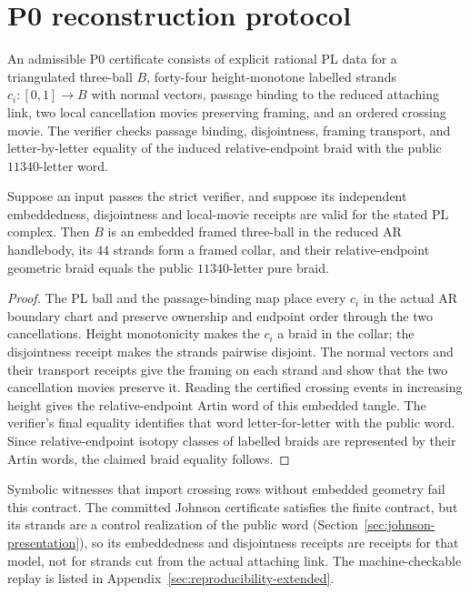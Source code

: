 \section{P0 reconstruction protocol}\label{app:p0-reconstruction}

An admissible P0 certificate consists of explicit rational PL data for a
triangulated three-ball $B$, forty-four height-monotone labelled strands
$c_i:[0,1]\to B$ with normal vectors, passage binding to the reduced
attaching link, two local cancellation movies preserving framing, and an
ordered crossing movie.  The verifier checks passage binding, disjointness,
framing transport, and letter-by-letter equality of the induced
relative-endpoint braid with the public $11340$-letter word.

\begin{lemma}
Suppose an input passes the strict verifier, and suppose its independent
embeddedness, disjointness and local-movie receipts are valid for the stated
PL complex.  Then $B$ is an embedded framed three-ball in the reduced AR
handlebody, its $44$ strands form a framed collar, and their relative-endpoint
geometric braid equals the public $11340$-letter pure braid.
\end{lemma}

\begin{proof}
The PL ball and the passage-binding map place every $c_i$ in the actual AR
boundary chart and preserve ownership and endpoint order through the two
cancellations.  Height monotonicity makes the $c_i$ a braid in the collar;
the disjointness receipt makes the strands pairwise disjoint.  The normal
vectors and their transport receipts give the framing on each strand and
show that the two cancellation movies preserve it.  Reading the certified
crossing events in increasing height gives the relative-endpoint Artin word
of this embedded tangle.  The verifier's final equality identifies that word
letter-for-letter with the public word.  Since relative-endpoint isotopy
classes of labelled braids are represented by their Artin words, the claimed
braid equality follows.
\end{proof}

\begin{remark}
Symbolic witnesses that import crossing rows without embedded geometry fail
this contract.  The committed Johnson certificate satisfies the finite
contract, but its strands are a control realization of the public word
(Section~\ref{sec:johnson-presentation}), so its embeddedness and
disjointness receipts are receipts for that model, not for strands cut from
the actual attaching link.  The machine-checkable replay is listed in
Appendix~\ref{sec:reproducibility-extended}.
\end{remark}
